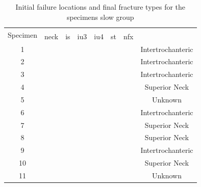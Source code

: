 \begin{table}
	\begin{center}
		\caption[Failure locations and fracture types for slow group]{Initial failure locations and final fracture types for the specimens slow group} %
		\label{tab:NishiyamaFractures}
		\begin{tabular}{|c||>{\centering}p{2em}|>{\centering}p{2em}|>{\centering}p{2em}|>{\centering}p{2em}|>{\centering}p{2em}|>{\centering}p{2em}|c|}
			\hline 
			\multirow{2}{*}{Specimen}	& \multicolumn{6}{c|}{Fracture Types}	 & \multirow{2}{*}{\lbCell{Initial Failure \\ Location}} \\ \cline{2-7}
			 & \ac{neck} & \ac{is} & \ac{iu3} & \ac{iu4} & \ac{st} & \ac{nfx} & \\ \hline
			
			\hline 1		&  &  & \checkmark &  &  & 			& Intertrochanteric	\\ 
			
			\hline 2		&  &  & \checkmark &  & &			& Intertrochanteric	\\ 
			
			\hline 3		&  & \checkmark &  &  &  & 			& Intertrochanteric	\\ 
			
			\hline 4		& \checkmark &  &  &  &  &  		& Superior Neck		\\ 
			
			\hline 5		&  & \checkmark &  &  &  &  		& Unknown		\\ 
			
			\hline 6		&  & \checkmark &  &  &  &  		& Intertrochanteric	\\ 
			
			\hline 7		& \checkmark &  &  &  &  & 			& Superior Neck		\\ 
			
			\hline 8		& \checkmark &  &  &  &  & 			& Superior Neck		\\ 
			
			\hline 9		&  & \checkmark &  &  &  &  		& Intertrochanteric	\\ 
			
			\hline 10		& \checkmark &  &  &  &  & 			& Superior Neck		\\ 
			
			\hline 11		&  & \checkmark &  &  &  &  		& Unknown		\\ 
			

\end{tabular}
\end{center}
\end{table}

